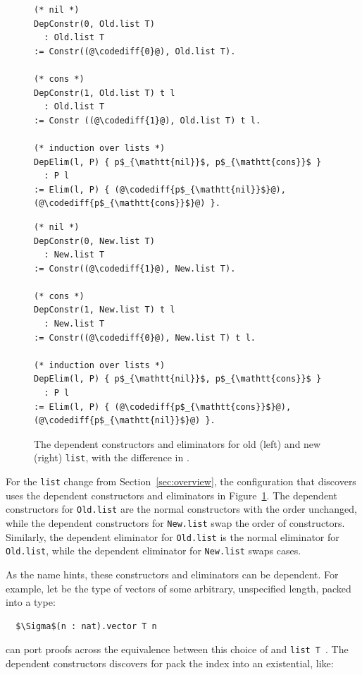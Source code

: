 \begin{figure}
\begin{minipage}{0.49\textwidth}
\begin{lstlisting}
(* nil *)
DepConstr(0, Old.list T)
  : Old.list T
:= Constr((@\codediff{0}@), Old.list T).

(* cons *)
DepConstr(1, Old.list T) t l
  : Old.list T
:= Constr ((@\codediff{1}@), Old.list T) t l.

(* induction over lists *)
DepElim(l, P) { p$_{\mathtt{nil}}$, p$_{\mathtt{cons}}$ }
  : P l
:= Elim(l, P) { (@\codediff{p$_{\mathtt{nil}}$}@), (@\codediff{p$_{\mathtt{cons}}$}@) }.
\end{lstlisting}
\end{minipage}
\hfill
\begin{minipage}{0.49\textwidth}
\begin{lstlisting}
(* nil *)
DepConstr(0, New.list T)
  : New.list T
:= Constr((@\codediff{1}@), New.list T).

(* cons *)
DepConstr(1, New.list T) t l
  : New.list T
:= Constr((@\codediff{0}@), New.list T) t l.

(* induction over lists *)
DepElim(l, P) { p$_{\mathtt{nil}}$, p$_{\mathtt{cons}}$ }
  : P l
:= Elim(l, P) { (@\codediff{p$_{\mathtt{cons}}$}@), (@\codediff{p$_{\mathtt{nil}}$}@) }.
\end{lstlisting}
\end{minipage}
\caption{The dependent constructors and eliminators for old (left) and new (right) \lstinline{list}, with the difference in .}
\label{fig:listconfig}
\end{figure}

For the \lstinline{list} change from Section~\ref{sec:overview},
the configuration that \toolnamec discovers uses the dependent constructors
and eliminators in Figure~\ref{fig:listconfig}. The dependent constructors for \lstinline{Old.list}
are the normal constructors with the order unchanged,
while the dependent constructors for \lstinline{New.list} swap the order of constructors.
Similarly, the dependent eliminator for \lstinline{Old.list} is the normal eliminator for \lstinline{Old.list},
while the dependent eliminator for \lstinline{New.list} swaps cases.

As the name hints, these constructors and eliminators can be dependent.
For example, let \B be the type of
vectors of some arbitrary, unspecified length,
packed into a \kl{$\Sigma$} type:

\begin{lstlisting}
  $\Sigma$(n : nat).vector T n
\end{lstlisting}
\toolnamec can port proofs across the equivalence between this choice of \B and \lstinline{list T}~\href{https://github.com/uwplse/pumpkin-pi/blob/v2.0.0/plugin/coq/examples/Example.v}{}. %
The dependent constructors \toolnamec discovers for \B pack the index into an existential, like:

